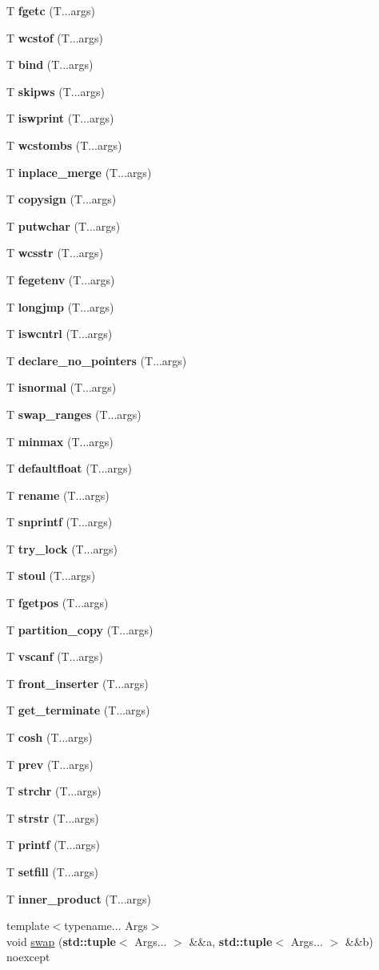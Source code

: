 \begin{DoxyCompactItemize}
T {\bf fgetc} (T...\+args)
\item 
T {\bf wcstof} (T...\+args)
\item 
T {\bf bind} (T...\+args)
\item 
T {\bf skipws} (T...\+args)
\item 
T {\bf iswprint} (T...\+args)
\item 
T {\bf wcstombs} (T...\+args)
\item 
T {\bf inplace\+\_\+merge} (T...\+args)
\item 
T {\bf copysign} (T...\+args)
\item 
T {\bf putwchar} (T...\+args)
\item 
T {\bf wcsstr} (T...\+args)
\item 
T {\bf fegetenv} (T...\+args)
\item 
T {\bf longjmp} (T...\+args)
\item 
T {\bf iswcntrl} (T...\+args)
\item 
T {\bf declare\+\_\+no\+\_\+pointers} (T...\+args)
\item 
T {\bf isnormal} (T...\+args)
\item 
T {\bf swap\+\_\+ranges} (T...\+args)
\item 
T {\bf minmax} (T...\+args)
\item 
T {\bf defaultfloat} (T...\+args)
\item 
T {\bf rename} (T...\+args)
\item 
T {\bf snprintf} (T...\+args)
\item 
T {\bf try\+\_\+lock} (T...\+args)
\item 
T {\bf stoul} (T...\+args)
\item 
T {\bf fgetpos} (T...\+args)
\item 
T {\bf partition\+\_\+copy} (T...\+args)
\item 
T {\bf vscanf} (T...\+args)
\item 
T {\bf front\+\_\+inserter} (T...\+args)
\item 
T {\bf get\+\_\+terminate} (T...\+args)
\item 
T {\bf cosh} (T...\+args)
\item 
T {\bf prev} (T...\+args)
\item 
T {\bf strchr} (T...\+args)
\item 
T {\bf strstr} (T...\+args)
\item 
T {\bf printf} (T...\+args)
\item 
T {\bf setfill} (T...\+args)
\item 
T {\bf inner\+\_\+product} (T...\+args)
\item 
{\footnotesize template$<$typename... Args$>$ }\\void \hyperlink{namespacestd_a094a73442afde9746a90fd3ab1e4843a}{swap} ({\bf std\+::tuple}$<$ Args... $>$ \&\&a, {\bf std\+::tuple}$<$ Args... $>$ \&\&b) noexcept
\end{DoxyCompactItemize}
